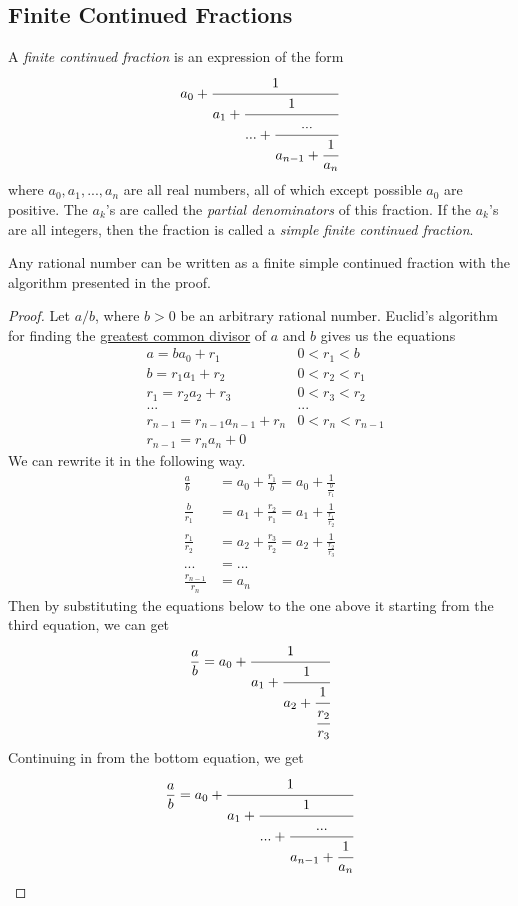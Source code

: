 \documentclass{article}
\newcounter{theorem}[section]
\newcounter{definition}[section]
\begin{document}
\subsection{Finite Continued Fractions}

\begin{definition}
  \label{def:finite-continued-fraction}
A \textit{finite continued fraction} is an expression of the form 
\begin{equation}
  a_0 + \cfrac{1}{a_1 + \cfrac{1}{... + \cfrac{...}{a_{n-1} + \cfrac{1}{a_n}}}}
\end{equation}
where $a_0, a_1, ..., a_n$ are all real numbers, all of which except possible $a_0$ are positive. The $a_k$'s are called the \textit{partial denominators} of this fraction. If the $a_k$'s are all integers, then the fraction is called a \textit{simple finite continued fraction}. 
\end{definition}

\begin{theorem}
  \label{thm:rationals-as-finite-simple-continued-fractions}
Any rational number can be written as a finite simple continued fraction with the algorithm presented in the proof. 
\end{theorem}
\begin{proof}
Let $a/b$, where $b >0$ be an arbitrary rational number. Euclid's algorithm for finding the \hyperref[alg-def:greatest-common-divisor]{greatest common divisor} of $a$ and $b$ gives us the equations 
\begin{align*}
    &a = b a_0 + r_1 & 0 < r_1 < b \\
    &b = r_1 a_1 + r_2 & 0 < r_2 < r_1 \\
    &r_1 = r_2 a_2 + r_3 & 0 < r_3 < r_2 \\
    &... & ... \\
    &r_{n-1} = r_{n-1} a_{n-1} + r_n & 0 < r_n < r_{n-1} \\
    &r_{n-1} = r_n a_n + 0 & 
\end{align*}
We can rewrite it in the following way. 
\begin{align*}
    \frac{a}{b} &= a_0 + \frac{r_1}{b} = a_0 + \frac{1}{\frac{b}{r_1}} \\
    \frac{b}{r_1} &= a_1 + \frac{r_2}{r_1} = a_1 + \frac{1}{\frac{r_1}{r_2}} \\
    \frac{r_1}{r_2} &= a_2 + \frac{r_3}{r_2} = a_2 + \frac{1}{\frac{r_2}{r_3}} \\
    ... & = ... \\
    \frac{r_{n-1}}{r_n} &= a_n
\end{align*}
Then by substituting the equations below to the one above it starting from the third equation, we can get
\begin{equation}
  \frac{a}{b} = a_0 + \cfrac{1}{a_1 + \cfrac{1}{a_2 + \cfrac{1}{\cfrac{r_2}{r_3}}}}
\end{equation}
Continuing in from the bottom equation, we get
\begin{equation}
  \frac{a}{b} = a_0 + \cfrac{1}{a_1 + \cfrac{1}{... + \cfrac{...}{a_{n-1} + \cfrac{1}{a_n}}}}
\end{equation}
\end{proof}
\end{document}
